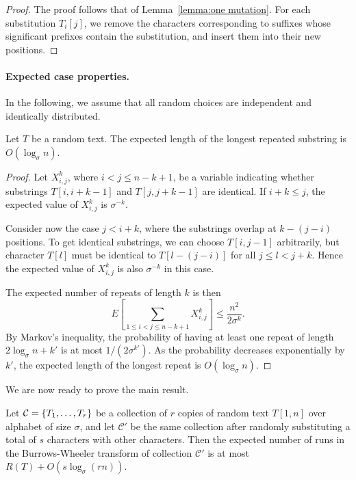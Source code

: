 \begin{proof}
The proof follows that of Lemma~\ref{lemma:one mutation}. For each substitution $T_{i}[j]$, we remove the characters corresponding to suffixes whose significant prefixes contain the substitution, and insert them into their new positions.
\end{proof}

\paragraph{Expected case properties.}

In the following, we assume that all random choices are independent and identically distributed.

\begin{lemma}\label{lemma:longest repeat}
Let $T$ be a random text. The expected length of the longest repeated substring is $O(\log_{\sigma} n)$.
\end{lemma}

\begin{proof}
Let $X_{i,j}^{k}$, where $i < j \le n-k+1$, be a variable indicating whether substrings $T[i,i+k-1]$ and $T[j,j+k-1]$ are identical. If $i+k \le j$, the expected value of $X_{i,j}^{k}$ is $\sigma^{-k}$.

Consider now the case $j < i+k$, where the substrings overlap at $k - (j-i)$ positions. To get identical substrings, we can choose $T[i,j-1]$ arbitrarily, but character $T[l]$ must be identical to $T[l - (j-i)]$ for all $j \le l < j+k$. Hence the expected value of $X_{i,j}^{k}$ is also $\sigma^{-k}$ in this case.

The expected number of repeats of length $k$ is then
$$
E\left[ \sum_{1 \le i < j \le n-k+1} X_{i,j}^{k} \right] \le \frac{n^{2}}{2 \sigma^{k}}.
$$
By Markov's inequality, the probability of having at least one repeat of length $2 \log_{\sigma} n + k'$ is at most $1/(2 \sigma^{k'})$. As the probability decreases exponentially by $k'$, the expected length of the longest repeat is $O(\log_{\sigma} n)$.
\end{proof}

We are now ready to prove the main result.

\begin{theorem}\label{theorem:expected case runs}
Let $\mathcal{C} = \{ T_{1}, \dotsc, T_{r} \}$ be a collection of $r$ copies of random text $T[1,n]$ over alphabet of size $\sigma$, and let $\mathcal{C'}$ be the same collection after randomly substituting a total of $s$ characters with other characters. Then the expected number of runs in the Burrows-Wheeler transform of collection $\mathcal{C'}$ is at most $R(T) + O(s \log_{\sigma} (rn))$.
\end{theorem}

